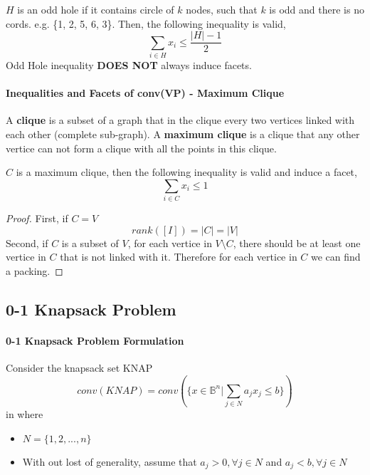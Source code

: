                 $H$ is an odd hole if it contains circle of $k$ nodes, such that $k$ is odd and there is no cords. e.g. \{1, 2, 5, 6, 3\}. Then, the following inequality is valid,
                \begin{equation*}
                    \sum_{i\in H}x_i\le \frac{|H|-1}2 \nonumber
                \end{equation*}
                Odd Hole inequality \textbf{DOES NOT} always induce facets.

            \paragraph{Inequalities and Facets of conv(VP) - Maximum Clique}
                A \textbf{clique} is a subset of a graph that in the clique every two vertices linked with each other (complete sub-graph). A \textbf{maximum clique} is a clique that any other vertice can not form a clique with all the points in this clique.

                $C$ is a maximum clique, then the following inequality is valid and induce a facet,
                \begin{equation*}
                    \sum_{i\in C} x_i \le 1 \nonumber
                \end{equation*}
                
                \begin{proof}
                    First, if $C=V$
                    \begin{equation*}
                        rank\left(\left[I\right]\right) = |C| = |V| \nonumber           
                    \end{equation*}
                    Second, if $C$ is a subset of $V$, for each vertice in $V \setminus C$, there should be at least one vertice in $C$ that is not linked with it. Therefore for each vertice in $C$ we can find a packing.
                \end{proof}                    

        \subsection{0-1 Knapsack Problem}
            \paragraph{0-1 Knapsack Problem Formulation}
                Consider the knapsack set KNAP
                \begin{equation*}conv(KNAP)= conv(\{x\in \mathbb{B}^n|\sum_{j\in N}a_jx_j\le b\})\end{equation*}
                in where
                \begin{itemize}
                    \item $N = \{1, 2, ..., n\}$
                    \item With out lost of generality, assume that $a_j > 0, \forall j \in N$ and $a_j < b, \forall j \in N$
                \end{itemize}

